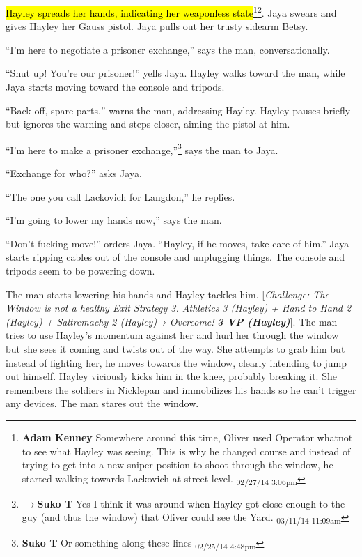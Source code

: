 \hl{Hayley spreads her hands, indicating her weaponless state}\footnote{\textbf{Adam Kenney }Somewhere around this time, Oliver used Operator whatnot to see what Hayley was seeing. This is why he changed course and instead of trying to get into a new sniper position to shoot through the window, he started walking towards Lackovich at street level. \textsubscript{02/27/14 3:06pm}}\footnote{$\rightarrow$\textbf{Suko T }Yes I think it was around when Hayley got close enough to the guy (and thus the window) that Oliver could see the Yard. \textsubscript{03/11/14 11:09am}}.  Jaya swears and gives Hayley her Gauss pistol.  Jaya pulls out her trusty sidearm Betsy.  



``I'm here to negotiate a prisoner exchange,'' says the man, conversationally.

``Shut up!  You're our prisoner!'' yells Jaya.  Hayley walks toward the man, while Jaya starts moving toward the console and tripods.



``Back off, spare parts,'' warns the man, addressing Hayley.  Hayley pauses briefly but ignores the warning and steps closer, aiming the pistol at him.



``I'm here to make a prisoner exchange,''\footnote{\textbf{Suko T }Or something along these lines \textsubscript{02/25/14 4:48pm}} says the man to Jaya.

``Exchange for who?'' asks Jaya.

``The one you call Lackovich for Langdon,'' he replies.



``I'm going to lower my hands now,'' says the man.

``Don't fucking move!'' orders Jaya.  ``Hayley, if he moves, take care of him.''  Jaya starts ripping cables out of the console and unplugging things.  The console and tripods seem to be powering down.



The man starts lowering his hands and Hayley tackles him.  {[}\textit{Challenge: The Window is not a healthy Exit Strategy 3. Athletics 3 (Hayley) + Hand to Hand 2 (Hayley) + Saltremachy 2 (Hayley)→ Overcome! }\textit{\textbf{3 VP (Hayley)}}{]}.  The man tries to use Hayley's momentum against her and hurl her through the window but she sees it coming and twists out of the way.  She attempts to grab him but instead of fighting her, he moves towards the window, clearly intending to jump out himself.  Hayley viciously kicks him in the knee, probably breaking it.  She remembers the soldiers in Nicklepan and immobilizes his hands so he can't trigger any devices.  The man stares out the window.



